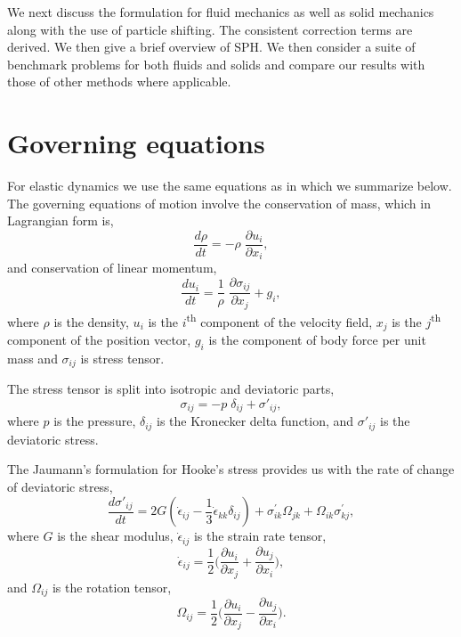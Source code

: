 We next discuss the formulation for fluid mechanics as well as solid mechanics
along with the use of particle shifting. The consistent correction terms are
derived. We then give a brief overview of SPH. We then consider a suite of
benchmark problems for both fluids and solids and compare our results with those
of other methods where applicable.

\section{Governing equations}
For elastic dynamics we use the same equations as in
\citep{gray-ed-2001,zhang_hu_adams17} which we summarize below. The governing
equations of motion involve the conservation of mass, which in Lagrangian
form is,
\begin{equation}
  \label{eq:ce}
  \frac{d \rho}{d t} = - \rho \; \frac{\partial u_i}{\partial x_i},
\end{equation}
and conservation of linear momentum,
\begin{equation}
  \label{eq:me}
  \frac{d u_i}{d t} = \frac{1}{\rho} \; \frac{\partial \sigma_{ij}}{\partial x_j}
  + g_i,
\end{equation}
where $\rho$ is the density, $u_i$ is the $i$\textsuperscript{th} component of
the velocity field, $x_j$ is the $j$\textsuperscript{th} component of the
position vector, $g_i$ is the component of body force per unit mass and
$\sigma_{ij}$ is stress tensor.

The stress tensor is split into isotropic and deviatoric parts,
\begin{equation}
  \label{eq:stress_tensor_decomposition}
  \sigma_{ij} = - p \; \delta_{ij} + \sigma'_{ij},
\end{equation}
%
where $p$ is the pressure, $\delta_{ij}$ is the Kronecker delta function, and
$\sigma'_{ij}$ is the deviatoric stress.

The Jaumann's formulation for Hooke's stress provides us with the rate of
change of deviatoric stress,
\begin{equation}
  \label{eq:jaumann-stress-rate}
  \frac{d \sigma'_{ij}}{dt} = 2G (\dot{\epsilon}_{ij} - \frac{1}{3}
  \dot{\epsilon}_{kk} \delta_{ij}) + \sigma^{'}_{ik}  \Omega_{jk} +
  \Omega_{ik} \sigma^{'}_{kj},
\end{equation}
where $G$ is the shear modulus, $\dot{\epsilon}_{ij}$ is the strain rate tensor,
\begin{equation}
  \label{eq:strain-tensor}
  \dot{\epsilon}_{ij} = \frac{1}{2} \bigg(\frac{\partial u_i}{\partial x_j} +
  \frac{\partial u_j}{\partial x_i} \bigg),
\end{equation}
and $\Omega_{ij}$ is the rotation tensor,
\begin{equation}
  \label{eq:rotational-tensor}
  \Omega_{ij} = \frac{1}{2} \bigg(\frac{\partial u_i}{\partial x_j} -
  \frac{\partial u_j}{\partial x_i} \bigg).
\end{equation}

